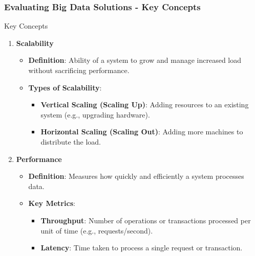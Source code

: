 \documentclass[aspectratio=169]{beamer}
\begin{document}
\begin{frame}[fragile]
  \frametitle{Evaluating Big Data Solutions - Key Concepts}
  \begin{block}{Key Concepts}
    \begin{enumerate}
      \item \textbf{Scalability}
        \begin{itemize}
          \item \textbf{Definition}: Ability of a system to grow and manage increased load without sacrificing performance.
          \item \textbf{Types of Scalability}:
            \begin{itemize}
              \item \textbf{Vertical Scaling (Scaling Up)}: Adding resources to an existing system (e.g., upgrading hardware).
              \item \textbf{Horizontal Scaling (Scaling Out)}: Adding more machines to distribute the load.
            \end{itemize}
        \end{itemize}
      \item \textbf{Performance}
        \begin{itemize}
          \item \textbf{Definition}: Measures how quickly and efficiently a system processes data.
          \item \textbf{Key Metrics}:
            \begin{itemize}
              \item \textbf{Throughput}: Number of operations or transactions processed per unit of time (e.g., requests/second).
              \item \textbf{Latency}: Time taken to process a single request or transaction.
            \end{itemize}
        \end{itemize}
    \end{enumerate}
  \end{block}
\end{frame}
\end{document}
